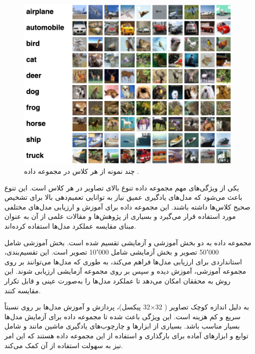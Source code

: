 \begin{figure}[b!]
	\centering
	\includegraphics[scale=0.7]{images/chap5/cifar10.png}%
	\caption{%
		چند نمونه از هر کلاس در مجموعه داده
		\cite{Evan2022CIFAR10}.
	}
	\label{cifar10}
	\centering
\end{figure}



یکی از ویژگی‌های مهم مجموعه داده
تنوع بالای تصاویر در هر کلاس است. این تنوع باعث می‌شود که مدل‌های یادگیری عمیق نیاز به توانایی تعمیم‌دهی بالا برای تشخیص صحیح کلاس‌ها داشته باشند. این مجموعه داده برای آموزش و ارزیابی مدل‌های مختلفی مورد استفاده قرار می‌گیرد و بسیاری از پژوهش‌ها و مقالات علمی از آن به عنوان مبنای مقایسه عملکرد مدل‌ها استفاده کرده‌اند.

مجموعه داده
به دو بخش آموزشی و آزمایشی تقسیم شده است. بخش آموزشی شامل 50٬000 تصویر و بخش آزمایشی شامل 10٬000 تصویر است. این تقسیم‌بندی، استانداردی برای ارزیابی مدل‌ها فراهم می‌کند، به طوری که مدل‌ها می‌توانند بر روی مجموعه آموزشی، آموزش دیده و سپس بر روی مجموعه آزمایشی ارزیابی شوند. این روش به محققان امکان می‌دهد تا عملکرد مدل‌ها را به‌صورت عینی و قابل تکرار مقایسه کنند.

به دلیل اندازه کوچک تصاویر (%
32$\times$32
پیکسل)، پردازش و آموزش مدل‌ها بر روی
نسبتاً سریع و کم هزینه است. این ویژگی باعث شده تا مجموعه داده 
برای آزمایش مدل‌ها بسیار مناسب باشد. بسیاری از ابزارها و چارچوب‌های%
یادگیری ماشین مانند
و
\cite{abadi2016tensorflow}
شامل توابع و ابزارهای آماده برای بارگذاری و استفاده از این مجموعه داده هستند که این امر نیز به سهولت استفاده از آن کمک می‌کند.

